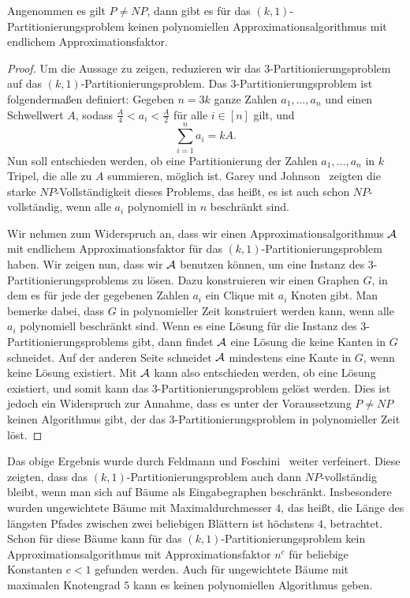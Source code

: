\begin{thm}\label{thm:np_comp}
    Angenommen es gilt $P \neq NP$, dann gibt es für das $(k,1)$\hyp Partitionierungsproblem keinen polynomiellen Approximationsalgorithmus mit endlichem Approximationsfaktor.
\end{thm}
\begin{proof}
    Um die Aussage zu zeigen, reduzieren wir das $3$\hyp Partitionierungsproblem auf das $(k,1)$\hyp Partitionierungsproblem. 
    Das $3$\hyp Partitionierungsproblem ist folgendermaßen definiert: Gegeben $n = 3k$ ganze Zahlen $a_1,\ldots, a_n$ und einen Schwellwert $A$, sodass $\frac{A}{4} < a_i < \frac{A}{2}$ für alle $i \in [n]$ gilt, und 
    \begin{equation*}
        \sum_{i=1}^{n} a_i = kA.
    \end{equation*}
    Nun soll entschieden werden, ob eine Partitionierung der Zahlen $a_1, \ldots, a_n$ in $k$ Tripel, die alle zu $A$ summieren, möglich ist. 
    Garey und Johnson~\parencite{gj79} zeigten die starke $NP$\hyp Vollständigkeit dieses Problems, das heißt, es ist auch schon $NP$\hyp vollständig, wenn alle $a_i$ polynomiell in $n$ beschränkt sind.

    Wir nehmen zum Widerspruch an, dass wir einen Approximationsalgorithmus $\mathcal{A}$ mit endlichem Approximationsfaktor für das $(k,1)$\hyp Partitionierungsproblem haben. 
    Wir zeigen nun, dass wir $\mathcal{A}$ benutzen können, um eine Instanz des $3$\hyp Partitionierungsproblems zu lösen.
    Dazu konstruieren wir einen Graphen $G$, in dem es für jede der gegebenen Zahlen $a_i$ ein Clique mit $a_i$ Knoten gibt.
	Man bemerke dabei, dass $G$ in polynomieller Zeit konstruiert werden kann, wenn alle $a_i$ polynomiell beschränkt sind.
    Wenn es eine Lösung für die Instanz des $3$\hyp Partitionierungsproblems gibt, dann findet $\mathcal{A}$ eine Lösung die keine Kanten in $G$ schneidet. 
    Auf der anderen Seite schneidet $\mathcal{A}$ mindestens eine Kante in $G$, wenn keine Lösung existiert.
    Mit $\mathcal{A}$ kann also entschieden werden, ob eine Lösung existiert, und somit kann das $3$\hyp Partitionierungsproblem gelöst werden.
    Dies ist jedoch ein Widerspruch zur Annahme, dass es unter der Voraussetzung $P \neq NP$ keinen Algorithmus gibt, der das $3$\hyp Partitionierungsproblem in polynomieller Zeit löst.
\end{proof}

\begin{rem}
    Das obige Ergebnis wurde durch Feldmann und Foschini~\parencite{FF15} weiter verfeinert. 
    Diese zeigten, dass das $(k,1)$\hyp Partitionierungsproblem auch dann $NP$\hyp vollständig bleibt, wenn man sich auf Bäume als Eingabegraphen beschränkt.
    Insbesondere wurden ungewichtete Bäume mit Maximaldurchmesser $4$, das heißt, die Länge des längsten Pfades zwischen zwei beliebigen Blättern ist höchstens $4$, betrachtet.
    Schon für diese Bäume kann für das $(k,1)$\hyp Partitionierungsproblem kein Approximationsalgorithmus mit Approximationsfaktor $n^c$ für beliebige Konstanten $c < 1$ gefunden werden.
    Auch für ungewichtete Bäume mit maximalen Knotengrad $5$ kann es keinen polynomiellen Algorithmus geben.
\end{rem}



